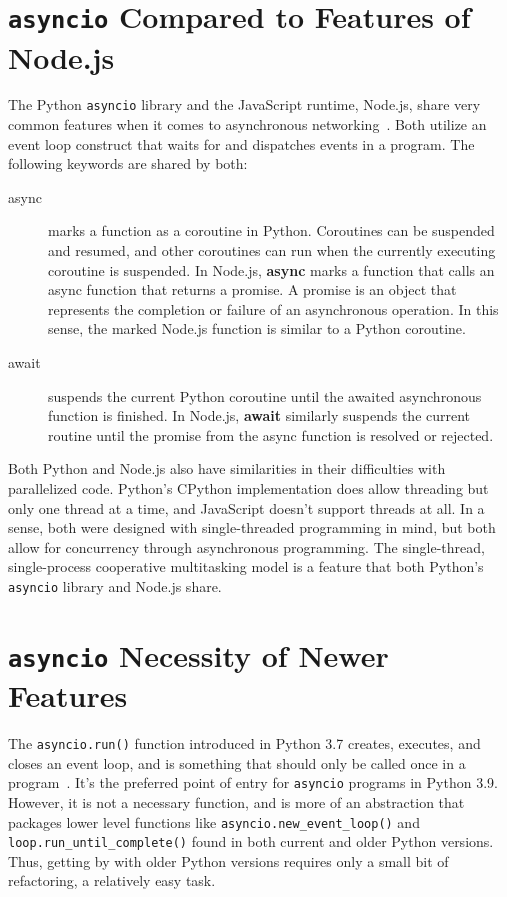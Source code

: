 \section{\texttt{asyncio} Compared to Features of Node.js}
The Python \texttt{asyncio} library and the JavaScript runtime, Node.js, share very common features when it comes to asynchronous networking~\cite{asyncionodejs}. Both utilize an event loop construct that waits for and dispatches events in a program. The following keywords are shared by both:
\begin{description}
  \item[async] marks a function as a coroutine in Python. Coroutines can be suspended and resumed, and other coroutines can run when the currently executing coroutine is suspended. In Node.js, \textbf{async} marks a function that calls an async function that returns a promise. A promise is an object that represents the completion or failure of an asynchronous operation. In this sense, the marked Node.js function is similar to a Python coroutine.
  \item[await] suspends the current Python coroutine until the awaited asynchronous function is finished. In Node.js, \textbf{await} similarly suspends the current routine until the promise from the async function is resolved or rejected.
\end{description}
Both Python and Node.js also have similarities in their difficulties with parallelized code. Python's CPython implementation does allow threading but only one thread at a time, and JavaScript doesn't support threads at all. In a sense, both were designed with single-threaded programming in mind, but both allow for concurrency through asynchronous programming. The single-thread, single-process cooperative multitasking model is a feature that both Python's \texttt{asyncio} library and Node.js share.

\section*{\texttt{asyncio} Necessity of Newer Features}
The \texttt{asyncio.run()} function introduced in Python 3.7 creates, executes, and closes an event loop, and is something that should only be called once in a program~\cite{asynciodocs}. It's the preferred point of entry for \texttt{asyncio} programs in Python 3.9. However, it is not a necessary function, and is more of an abstraction that packages lower level functions like \texttt{asyncio.new\_event\_loop()} and \texttt{loop.run\_until\_complete()} found in both current and older Python versions. Thus, getting by with older Python versions requires only a small bit of refactoring, a relatively easy task.

